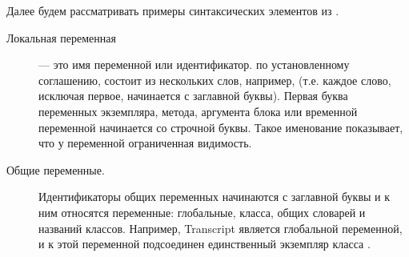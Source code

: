 \documentclass[a4paper,10pt,twoside]{book}
\begin{document}
Далее будем рассматривать примеры синтаксических элементов из .

\begin{description}
\item[Локальная переменная]	 --- это имя переменной или идентификатор.
		по установленному соглашению, состоит из нескольких слов, например, 
		 (т.е. каждое слово, исключая первое, начинается с заглавной буквы).
		Первая буква переменных экземпляра, метода, аргумента блока или временной переменной начинается со строчной буквы.
		Такое именование показывает, что у переменной ограниченная видимость.


\item[Общие переменные.]	Идентификаторы общих переменных начинаются с заглавной буквы и к ним относятся переменные:
		глобальные, класса, общих словарей и названий классов.
		Например, Transcript является глобальной переменной, и к этой переменной подсоединен единственный экземпляр класса .



\end{description}
\end{document}
